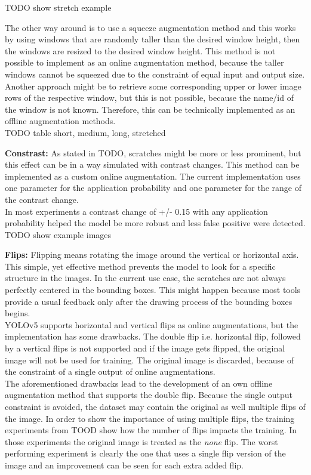 TODO show stretch example

The other way around is to use a squeeze augmentation method and this works by using windows that are randomly taller than the desired window height, then the windows are resized to the desired window height. This method is not possible to implement as an online augmentation method, because the taller windows cannot be squeezed due to the constraint of equal input and output size. Another approach might be to retrieve some corresponding upper or lower image rows of the respective window, but this is not possible, because the name/id of the window is not known. Therefore, this can be technically implemented as an offline augmentation methods. \\

TODO table short, medium, long, stretched


\textbf{Constrast:} As stated in TODO, scratches might be more or less prominent, but this effect can be in a way simulated with contrast changes. This method can be implemented as a custom online augmentation. The current implementation uses one parameter for the application probability and one parameter for the range of the contrast change. \\
In most experiments a contrast change of +/- 0.15 with any application probability helped the model be more robust and less false positive were detected. \\

TODO show example images

\textbf{Flips:} Flipping means rotating the image around the vertical or horizontal axis. This simple, yet effective method prevents the model to look for a specific structure in the images. In the current use case, the scratches are not always perfectly centered in the bounding boxes. This might happen because most tools provide a usual feedback only after the drawing process of the bounding boxes begins. \\
YOLOv5 supports horizontal and vertical flips as online augmentations, but the implementation has some drawbacks. The double flip i.e. horizontal flip, followed by a vertical flips is not supported and if the image gets flipped, the original image will not be used for training. The original image is discarded, because of the constraint of a single output of online augmentations. \\
The aforementioned drawbacks lead to the development of an own offline augmentation method that supports the double flip. Because the single output constraint is avoided, the dataset may contain the original as well multiple flips of the image. In order to show the importance of using multiple flips, the training experiments from TOOD show how the number of flips impacts the training. In those experiments the original image is treated as the \textit{none} flip. The worst performing experiment is clearly the one that uses a single flip version of the image and an improvement can be seen for each extra added flip. \\

